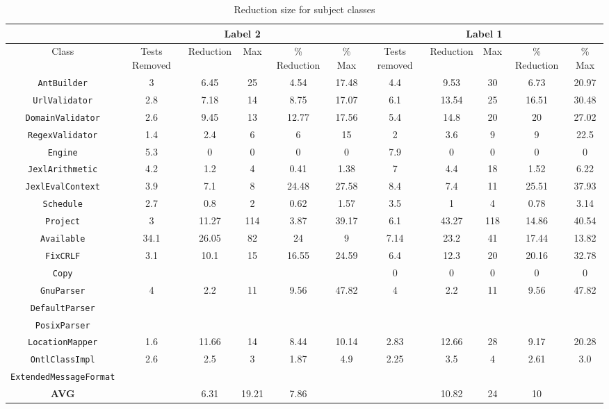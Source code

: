 \begin{table*}
\begin{center}
\begin{tabular}{|c||c|c|c|c|c||c|c|c|c|c|}
\hline
\hline
& \multicolumn{5}{|c|}{Label 2} & \multicolumn{5}{|c|}{Label 1} \\
\hline
Class & Tests Removed & Reduction & Max & \% Reduction & \% Max & Tests removed & Reduction & Max & \% Reduction & \% Max \\
\hline
\hline
{\tt AntBuilder} & 3 & 6.45 & 25 & 4.54 & 17.48 & 4.4 & 9.53 & 30 & 6.73 & 20.97 \\
\hline
{\tt UrlValidator} & 2.8 & 7.18 & 14 & 8.75 & 17.07 & 6.1 & 13.54 & 25 & 16.51 & 30.48 \\
\hline
{\tt DomainValidator} & 2.6 & 9.45 & 13 & 12.77 & 17.56 & 5.4 & 14.8 & 20 & 20 & 27.02 \\
\hline
{\tt RegexValidator} & 1.4 & 2.4 & 6 & 6 & 15 & 2 & 3.6 & 9 & 9 & 22.5 \\
\hline
{\tt Engine} & 5.3 & 0 & 0 & 0 & 0 & 7.9 & 0 & 0 & 0 & 0 \\
\hline
{\tt JexlArithmetic} & 4.2 & 1.2 & 4 & 0.41 & 1.38 & 7 & 4.4 & 18 & 1.52 & 6.22 \\ 
\hline
{\tt JexlEvalContext} & 3.9 & 7.1 & 8 & 24.48 & 27.58 & 8.4 & 7.4 & 11 & 25.51 & 37.93\\
\hline
{\tt Schedule} & 2.7 & 0.8 & 2 & 0.62 & 1.57 & 3.5 & 1 & 4 & 0.78 & 3.14\\
\hline
{\tt Project} & 3 & 11.27 & 114 & 3.87 & 39.17 & 6.1 & 43.27 & 118 & 14.86 & 40.54\\
\hline
{\tt Available} & 34.1 & 26.05 & 82 & 24 & 9 & 7.14 & 23.2 & 41 & 17.44 & 13.82\\
\hline
{\tt FixCRLF} & 3.1 & 10.1 & 15 & 16.55 & 24.59 & 6.4 & 12.3 & 20 & 20.16 & 32.78\\
\hline
{\tt Copy} &  &  &  &  &  & 0 & 0 & 0 & 0 & 0\\
\hline
{\tt GnuParser} & 4 & 2.2 & 11 & 9.56 & 47.82 & 4 & 2.2 & 11 & 9.56 & 47.82\\
\hline
{\tt DefaultParser} &  &  &  &  &  &  &  &  &  & \\
\hline
{\tt PosixParser} &  &  &  &  &  &  &  &  &  & \\
\hline

{\tt LocationMapper} & 1.6 & 11.66 & 14 & 8.44 & 10.14 & 2.83 & 12.66 & 28 & 9.17 & 20.28\\
\hline
{\tt OntlClassImpl} & 2.6 & 2.5 & 3 & 1.87 & 4.9 & 2.25 & 3.5 & 4 & 2.61 & 3.0  \\
\hline
{\tt ExtendedMessageFormat} &  &  &  &  &  &  &  &  &  & \\
\hline
\hline
{\bf AVG} & & 6.31 & 19.21 & 7.86 &  &  & 10.82 & 24 & 10 &  \\
\hline
\hline
\end{tabular}
\end{center}
\caption{Reduction size for subject classes}
\label{tab:avgimproved}
\end{table*}
